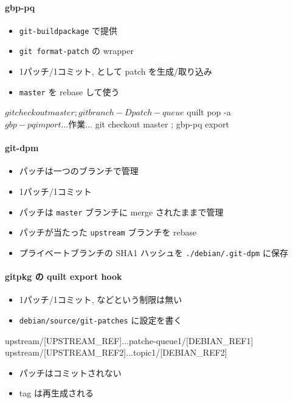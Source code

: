 \documentclass[mingoth,a4paper]{jsarticle}
\begin{document}
\paragraph{gbp-pq}
\label{sec-4-7-1}

\begin{itemize}
\item \texttt{git-buildpackage} で提供
\item \texttt{git format-patch} の wrapper
\item 1パッチ/1コミット, として patch を生成/取り込み
\item \texttt{master} を rebase して使う
\end{itemize}
\label{sec-4-7-2}
\begin{commandline}
$ git checkout master ; git branch -D patch-queue
$ quilt pop -a
$ gbp-pq import
 ... 作業 ...
$ git checkout master ; gbp-pq export
\end{commandline}

\paragraph{git-dpm}
\label{sec-4-8-1}

\begin{itemize}
\item パッチは一つのブランチで管理
\item 1パッチ/1コミット
\item パッチは \texttt{master} ブランチに merge されたままで管理
\item パッチが当たった \texttt{upstream} ブランチを rebase
\item プライベートブランチの SHA1 ハッシュを
      \texttt{./debian/.git-dpm} に保存
\end{itemize}
\label{sec-4-9}
\paragraph{gitpkg の quilt export hook}
\label{sec-4-9-1}

\begin{itemize}
\item 1パッチ/1コミット, などという制限は無い
\item \texttt{debian/source/git-patches} に設定を書く
\end{itemize}
    \begin{commandline}
    upstream/[UPSTREAM_REF]...patche-queue1/[DEBIAN_REF1]
    upstream/[UPSTREAM_REF2]...topic1/[DEBIAN_REF2]
    \end{commandline}
\begin{itemize}
\item パッチはコミットされない
\item tag は再生成される
\end{itemize}
\end{document}

